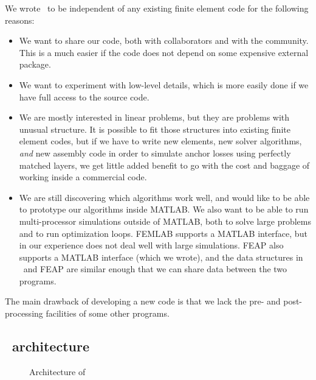 We wrote \hiq\ to be independent of any existing finite element code
for the following reasons:
\begin{itemize}

  \item We want to share our code, both with collaborators and with
  the community.  This is a much easier if the code does not depend on
  some expensive external package.

  \item We want to experiment with low-level details, which is more
  easily done if we have full access to the source code.

  \item We are mostly interested in linear problems, but they are
  problems with unusual structure.  It is possible to fit those
  structures into existing finite element codes, but if we have to
  write new elements, new solver algorithms, \emph{and} new assembly
  code in order to simulate anchor losses using perfectly matched
  layers, we get little added benefit to go with the cost and baggage
  of working inside a commercial code.

  \item We are still discovering which algorithms work well, and would
  like to be able to prototype our algorithms inside MATLAB.  We also
  want to be able to run multi-processor simulations outside of
  MATLAB, both to solve large problems and to run optimization loops.
  FEMLAB supports a MATLAB interface, but in our experience does not
  deal well with large simulations.  FEAP also supports a MATLAB
  interface (which we wrote), and the data structures in \hiq\ and
  FEAP are similar enough that we can share data between the two
  programs.

\end{itemize}

The main drawback of developing a new code is that we lack the pre-
and post-processing facilities of some other programs.


\subsection{\hiq\ architecture}

\begin{figure}
  \begin{center}
  \scalebox{1}{  }
  \end{center}
  \caption{Architecture of \hiq}
\end{figure}

